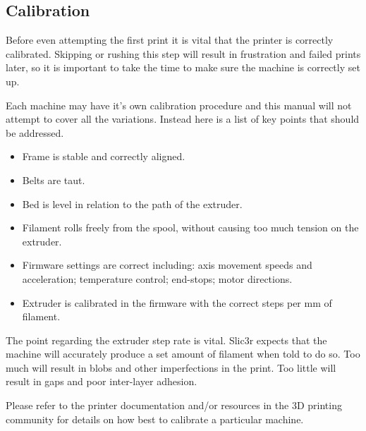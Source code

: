 \subsection{Calibration}
\label{calibration}
Before even attempting the first print it is vital that the printer is correctly calibrated.  Skipping or rushing this step will result in frustration and failed prints later, so it is important to take the time to make sure the machine is correctly set up.

Each machine may have it's own calibration procedure and this manual will not attempt to cover all the variations.  Instead here is a list of key points that should be addressed. 

\begin{itemize}
\item Frame is stable and correctly aligned.
\item Belts are taut.
\item Bed is level in relation to the path of the extruder.
\item Filament rolls freely from the spool, without causing too much tension on the extruder.
\item Firmware settings are correct including: axis movement speeds and acceleration; temperature control; end-stops; motor directions.
\item Extruder is calibrated in the firmware with the correct steps per mm of filament.
\end{itemize}

The point regarding the extruder step rate is vital.  Slic3r expects that the machine will accurately produce a set amount of filament when told to do so.  Too much will result in blobs and other imperfections in the print.  Too little will result in gaps and poor inter-layer adhesion.

Please refer to the printer documentation and/or resources in the 3D printing community for details on how best to calibrate a particular machine.

